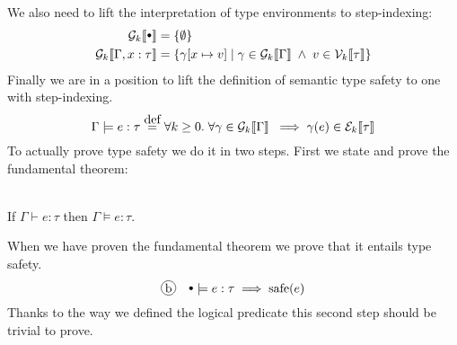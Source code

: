 We also need to lift the interpretation of type environments to step-indexing:
\begin{align*}
  \gpres{\mtenv} & = \{\emptyset \} \\
  \gpres{\Gamma, x : \tau} & = \{ \gamma[x \mapsto v] \vbar \gamma \in \gpres{\Gamma} \pand v \in \vpres{\tau} \}
\end{align*}
Finally we are in a position to lift the definition of semantic type safety to one with step-indexing.
\[
  \Gamma \models e : \tau \eqdef \forall k \geq 0. \; \forall \gamma \in \gpres{\Gamma} \; \implies \gamma(e) \in \epres{\tau}
\]
To actually prove type safety we do it in two steps. First we state and prove the fundamental theorem:
\begin{stlcmufundprop} ~\\
  If $\Gamma \vdash e : \tau$ then $\Gamma \models e : \tau$.
\end{stlcmufundprop}
When we have proven the fundamental theorem we prove that it entails type safety.
\[
\circled{b} \quad \mtenv \models e : \tau \implies \safe(e)
\]
Thanks to the way we defined the logical predicate this second step should be trivial to prove.

